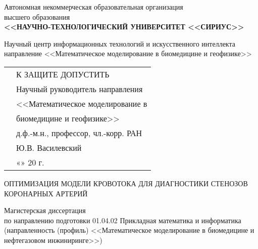 \thispagestyle{empty}

\begin{center}
    \small Автономная некоммерческая образовательная организация \\
    высшего образования \\
    \uppercase{\textbf{<<Научно-технологический университет <<Сириус>>}}

    \vspace{20pt}

    \small Научный центр информационных технологий и искусственного интеллекта \\
    направление <<Математическое моделирование в биомедицине и геофизике>>

    \vspace{20pt}
    
\end{center}

\noindent
\begin{tabularx}{\textwidth}{Xl}
    & К ЗАЩИТЕ ДОПУСТИТЬ \\
    \addlinespace[2mm] 
    & \small Научный руководитель направления \\
    & \small <<Математическое моделирование в \\
    & \small биомедицине и геофизике>> \\
    & \small д.ф.-м.н., профессор, чл.-корр. РАН \\
    & \small \underline{\hspace{3cm}} Ю.В. Василевский \\
    & \small «\underline{\hspace{1cm}}» \underline{\hspace{2cm}} 20\underline{\hspace{1cm}} г. \\
\end{tabularx}

\vspace{20pt}

\begin{center}
    \uppercase{Оптимизация модели кровотока для диагностики стенозов коронарных артерий} \\  

    \vspace{20pt}

    \small Магистерская диссертация  \\
    
    \small по направлению подготовки 01.04.02 Прикладная математика и информатика \\
    
    \small (направленность (профиль) <<Математическое моделирование в биомедицине и нефтегазовом инжиниринге>>)   
\end{center}

